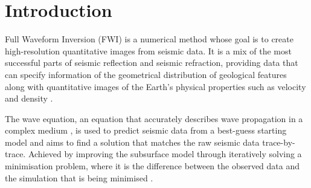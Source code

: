 
\chapter{Introduction}
\label{intro}

Full Waveform Inversion (FWI) is a numerical method whose goal is to create high-resolution quantitative images from seismic data. It is a mix of the most successful parts of seismic reflection and seismic refraction, providing data that can specify information of the geometrical distribution of geological features along with quantitative images of the Earth's physical properties such as velocity and density \citep{tarantola2005inverse}. \par

The wave equation, an equation that accurately describes wave propagation in a complex medium \citep{mulder2004comparison}, is used to predict seismic data from a best-guess starting model and aims to find a solution that matches the raw seismic data trace-by-trace. Achieved by improving the subsurface model through iteratively solving a minimisation problem, where it is the difference between the observed data and the simulation that is being minimised \citep{warner2013anisotropic}. \par

